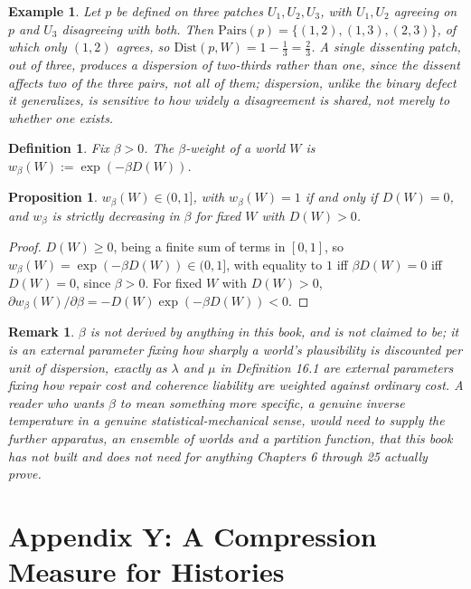 \documentclass[11pt]{book}
\newtheorem*{appendixdefinition}{Definition}
\newtheorem*{appendixproposition}{Proposition}
\newtheorem*{appendixremark}{Remark}
\newtheorem*{appendixexample}{Example}
\begin{document}
\begin{appendixexample}
Let $p$ be defined on three patches $U_1, U_2, U_3$, with $U_1, U_2$ agreeing on $p$ and $U_3$ disagreeing with both. Then $\mathrm{Pairs}(p) = \{(1,2),(1,3),(2,3)\}$, of which only $(1,2)$ agrees, so $\mathrm{Dist}(p,W) = 1 - \tfrac13 = \tfrac23$. A single dissenting patch, out of three, produces a dispersion of two-thirds rather than one, since the dissent affects two of the three pairs, not all of them; dispersion, unlike the binary defect it generalizes, is sensitive to how widely a disagreement is shared, not merely to whether one exists.
\end{appendixexample}

\begin{appendixdefinition}
Fix $\beta > 0$. The \emph{$\beta$-weight} of a world $W$ is $w_\beta(W) := \exp(-\beta D(W))$.
\end{appendixdefinition}

\begin{appendixproposition}
$w_\beta(W) \in (0,1]$, with $w_\beta(W) = 1$ if and only if $D(W) = 0$, and $w_\beta$ is strictly decreasing in $\beta$ for fixed $W$ with $D(W) > 0$.
\end{appendixproposition}

\begin{proof}
$D(W) \geq 0$, being a finite sum of terms in $[0,1]$, so $w_\beta(W) = \exp(-\beta D(W)) \in (0,1]$, with equality to $1$ iff $\beta D(W) = 0$ iff $D(W) = 0$, since $\beta > 0$. For fixed $W$ with $D(W) > 0$, $\partial w_\beta(W)/\partial\beta = -D(W)\exp(-\beta D(W)) < 0$.
\end{proof}

\begin{appendixremark}
$\beta$ is not derived by anything in this book, and is not claimed to be; it is an external parameter fixing how sharply a world's plausibility is discounted per unit of dispersion, exactly as $\lambda$ and $\mu$ in Definition 16.1 are external parameters fixing how repair cost and coherence liability are weighted against ordinary cost. A reader who wants $\beta$ to mean something more specific, a genuine inverse temperature in a genuine statistical-mechanical sense, would need to supply the further apparatus, an ensemble of worlds and a partition function, that this book has not built and does not need for anything Chapters 6 through 25 actually prove.
\end{appendixremark}

\chapter*{Appendix Y: A Compression Measure for Histories}
\end{document}
